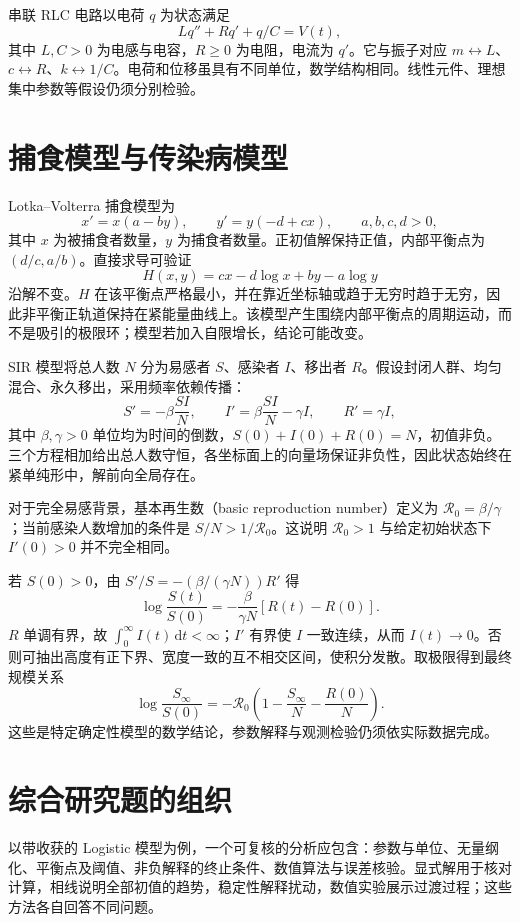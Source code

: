 串联 RLC 电路以电荷 $q$ 为状态满足
\[
 Lq''+Rq'+q/C=V(t),
\]
其中 $L,C>0$ 为电感与电容，$R\geq0$ 为电阻，电流为 $q'$。它与振子对应 $m\leftrightarrow L$、$c\leftrightarrow R$、$k\leftrightarrow1/C$。电荷和位移虽具有不同单位，数学结构相同。线性元件、理想集中参数等假设仍须分别检验。

\section{捕食模型与传染病模型}
Lotka--Volterra 捕食模型为
\[
 x'=x(a-by),\qquad y'=y(-d+cx),\qquad a,b,c,d>0,
\]
其中 $x$ 为被捕食者数量，$y$ 为捕食者数量。正初值解保持正值，内部平衡点为 $(d/c,a/b)$。直接求导可验证
\[
 H(x,y)=cx-d\log x+by-a\log y
\]
沿解不变。$H$ 在该平衡点严格最小，并在靠近坐标轴或趋于无穷时趋于无穷，因此非平衡正轨道保持在紧能量曲线上。该模型产生围绕内部平衡点的周期运动，而不是吸引的极限环；模型若加入自限增长，结论可能改变。

SIR 模型将总人数 $N$ 分为易感者 $S$、感染者 $I$、移出者 $R$。假设封闭人群、均匀混合、永久移出，采用频率依赖传播：
\begin{equation}
 S'=-\beta\frac{SI}{N},\qquad
 I'=\beta\frac{SI}{N}-\gamma I,\qquad
 R'=\gamma I,
 \label{eq:ode-sir}
\end{equation}
其中 $\beta,\gamma>0$ 单位均为时间的倒数，$S(0)+I(0)+R(0)=N$，初值非负。三个方程相加给出总人数守恒，各坐标面上的向量场保证非负性，因此状态始终在紧单纯形中，解前向全局存在。

对于完全易感背景，基本再生数（basic reproduction number）定义为 $\mathcal R_0=\beta/\gamma$；当前感染人数增加的条件是 $S/N>1/\mathcal R_0$。这说明 $\mathcal R_0>1$ 与给定初始状态下 $I'(0)>0$ 并不完全相同。

若 $S(0)>0$，由 $S'/S=-(\beta/(\gamma N))R'$ 得
\[
 \log\frac{S(t)}{S(0)}=-\frac{\beta}{\gamma N}[R(t)-R(0)].
\]
$R$ 单调有界，故 $\int_0^\infty I(t)\,\mathrm dt<\infty$；$I'$ 有界使 $I$ 一致连续，从而 $I(t)\to0$。否则可抽出高度有正下界、宽度一致的互不相交区间，使积分发散。取极限得到最终规模关系
\[
 \log\frac{S_\infty}{S(0)}
 =-\mathcal R_0\left(1-\frac{S_\infty}{N}-\frac{R(0)}{N}\right).
\]
这些是特定确定性模型的数学结论，参数解释与观测检验仍须依实际数据完成。

\section{综合研究题的组织}
以带收获的 Logistic 模型为例，一个可复核的分析应包含：参数与单位、无量纲化、平衡点及阈值、非负解释的终止条件、数值算法与误差核验。显式解用于核对计算，相线说明全部初值的趋势，稳定性解释扰动，数值实验展示过渡过程；这些方法各自回答不同问题。

